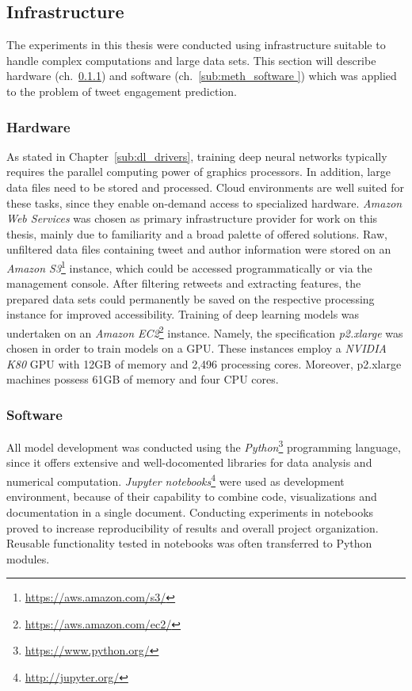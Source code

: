 \subsection{Infrastructure}
\label{sec:infrastructure}

The experiments in this thesis were conducted using infrastructure suitable
to handle complex computations and large data sets.
This section will describe hardware (ch.~\ref{sub:meth_hardware}) and software
(ch.~\ref{sub:meth_software }) which was applied to the problem of tweet
engagement prediction.

\subsubsection{Hardware}
\label{sub:meth_hardware}

As stated in Chapter~\ref{sub:dl_drivers}, training deep neural networks
typically requires the parallel computing power of graphics processors.
In addition, large data files need to be stored and processed.
Cloud environments are well suited for these tasks, since they enable on-demand 
access to specialized hardware.
\textit{Amazon Web Services} was chosen as primary infrastructure provider for 
work on this thesis, mainly due to familiarity and a broad palette of offered
solutions.
Raw, unfiltered data files containing tweet and author information were stored
on an \textit{Amazon S3}\footnote{\url{https://aws.amazon.com/s3/}} instance,
which could be accessed programmatically or via the management console.
After filtering retweets and extracting features, the prepared data sets could
permanently be saved on the respective processing instance for improved
accessibility.
Training of deep learning models was undertaken on an \textit{Amazon EC2}\footnote{\url{https://aws.amazon.com/ec2/}}
instance.
Namely, the specification \textit{p2.xlarge} was chosen in order to train models
on a GPU.
These instances employ a \textit{NVIDIA K80} GPU with 12GB of memory and 2,496
processing cores.
Moreover, p2.xlarge machines possess 61GB of memory and four CPU cores.

\subsubsection{Software}
\label{sub:meth_software}

All model development was conducted using the \textit{Python}\footnote{\url{https://www.python.org/}} programming language,
since it offers extensive and well-docomented libraries for data analysis and numerical computation.
\textit{Jupyter notebooks}\footnote{\url{http://jupyter.org/}} were used as development environment, because
of their capability to combine code, visualizations and documentation in a single
document.
Conducting experiments in notebooks proved to increase reproducibility of results
and overall project organization.
Reusable functionality tested in notebooks was often transferred to Python
modules.

